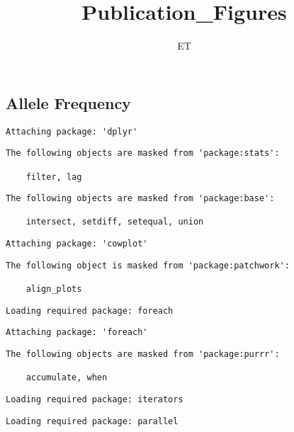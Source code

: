 \documentclass[
  letterpaper,
  DIV=11,
  numbers=noendperiod]{scrartcl}
\title{Publication\_Figures}
\author{ET}
\date{}
\begin{document}
\maketitle

\hypertarget{allele-frequency}{%
\subsection{Allele Frequency}\label{allele-frequency}}

\begin{verbatim}
Attaching package: 'dplyr'
\end{verbatim}

\begin{verbatim}
The following objects are masked from 'package:stats':

    filter, lag
\end{verbatim}

\begin{verbatim}
The following objects are masked from 'package:base':

    intersect, setdiff, setequal, union
\end{verbatim}

\begin{verbatim}
Attaching package: 'cowplot'
\end{verbatim}

\begin{verbatim}
The following object is masked from 'package:patchwork':

    align_plots
\end{verbatim}

\begin{verbatim}
Loading required package: foreach
\end{verbatim}

\begin{verbatim}
Attaching package: 'foreach'
\end{verbatim}

\begin{verbatim}
The following objects are masked from 'package:purrr':

    accumulate, when
\end{verbatim}

\begin{verbatim}
Loading required package: iterators
\end{verbatim}

\begin{verbatim}
Loading required package: parallel
\end{verbatim}
\end{document}
